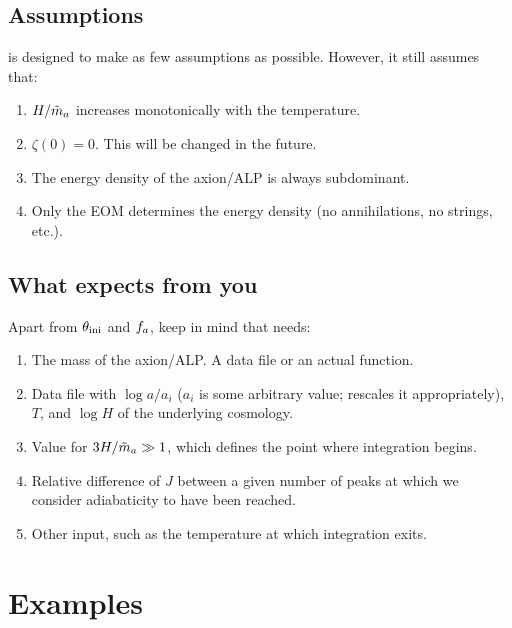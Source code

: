 \documentclass[10pt,utf8,compress,xcolor=dvipsnames]{beamer}
\begin{document}
\subsection{Assumptions}
\begin{frame}[fragile]{\insertsubsectionhead}
	
	\mimes is designed to make as few assumptions as possible. However, it still assumes that:\pause
	\begin{enumerate}
		\item $H/\tilde m_{a}{}$ increases monotonically with the temperature.\pause
		\item $\zeta(0)=0$. This will be changed in the future.\pause
		\item The energy density of the axion/ALP is always subdominant.\pause
		\item Only the EOM determines the energy density (no annihilations, no strings, etc.).
	\end{enumerate}	
\end{frame}


\subsection{What \mimes expects from you}
\begin{frame}[fragile]{\insertsubsectionhead}
	Apart from $\theta_{\rm ini}{}$ and $f_{a}{}$, keep in mind that \mimes needs:\pause
	\begin{enumerate}
		\item The mass of the axion/ALP. A data file or an actual function.\pause
		\item Data file with $\log a/a_i$ ($a_i$ is some arbitrary value; \mimes rescales it appropriately), $T$, and $\log H$ of the underlying cosmology.\pause
		\item Value for $3H/\tilde m_{a}{} \gg 1$, which defines the point where integration begins.\pause
		\item Relative difference of $J$ between a given number of peaks at which we consider adiabaticity to have been reached.\pause
		\item Other input, such as the temperature at which integration exits.
	\end{enumerate}
\end{frame}



\section{Examples}
\end{document}
